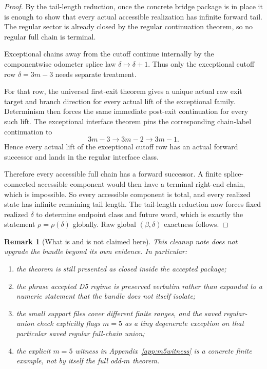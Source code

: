 \documentclass[11pt]{article}
\newtheorem{remark}[theorem]{Remark}
\begin{document}
\begin{proof}
By the tail-length reduction, once the concrete bridge package is in place it is
enough to show that every actual accessible realization has infinite forward
tail. The regular sector is already closed by the regular continuation theorem,
so no regular full chain is terminal.

Exceptional chains away from the cutoff continue internally by the componentwise
odometer splice law $\delta \mapsto \delta+1$. Thus only the exceptional cutoff
row $\delta=3m-3$ needs separate treatment.

For that row, the universal first-exit theorem gives a unique actual raw exit
target and branch direction for every actual lift of the exceptional family.
Determinism then forces the same immediate post-exit continuation for every such
lift. The exceptional interface theorem pins the corresponding chain-label
continuation to
\[
3m-3 \to 3m-2 \to 3m-1.
\]
Hence every actual lift of the exceptional cutoff row has an actual forward
successor and lands in the regular interface class.

Therefore every accessible full chain has a forward successor. A finite
splice-connected accessible component would then have a terminal right-end
chain, which is impossible. So every accessible component is total, and every
realized state has infinite remaining tail length. The tail-length reduction now
forces fixed realized $\delta$ to determine endpoint class and future word,
which is exactly the statement $\rho=\rho(\delta)$ globally. Raw global
$(\beta,\delta)$ exactness follows.
\end{proof}

\begin{remark}[What is and is not claimed here]
This cleanup note does not upgrade the bundle beyond its own evidence. In
particular:
\begin{enumerate}[label=\textup{(\alph*)},leftmargin=2.2em]
\item the theorem is still presented as closed \emph{inside the accepted
package};
\item the phrase \emph{accepted D5 regime} is preserved verbatim rather than
expanded to a numeric statement that the bundle does not itself isolate;
\item the small support files cover different finite ranges, and the saved
regular-union check explicitly flags $m=5$ as a tiny degenerate exception on
that particular saved regular full-chain union;
\item the explicit $m=5$ witness in Appendix~\ref{app:m5witness} is a concrete
finite example, not by itself the full odd-$m$ theorem.
\end{enumerate}
\end{remark}
\end{document}
